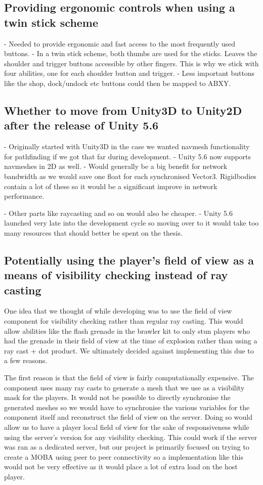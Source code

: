 \subsection{Providing ergonomic controls when using a twin stick scheme}
    - Needed to provide ergonomic and fast access to the most frequently used buttons. 
    - In a twin stick scheme, both thumbs are used for the sticks. Leaves the shoulder and trigger buttons accessible by other fingers. This is why we stick with four abilities, one for each shoulder button and trigger.
    - Less important buttons like the shop, dock/undock etc buttons could then be mapped to ABXY. 

\subsection{Whether to move from Unity3D to Unity2D after the release of Unity 5.6}
    - Originally started with Unity3D in the case we wanted navmesh functionality for pathfinding if we got that far during development. 
    - Unity 5.6 now supports navmeshes in 2D as well.
    - Would generally be a big benefit for network bandwidth as we would save one float for each synchronised Vector3. Rigidbodies contain a lot of these so it would be a significant improve in network performance. 
    
    - Other parts like raycasting and so on would also be cheaper. 
    - Unity 5.6 launched very late into the development cycle so moving over to it would take too many resources that should better be spent on the thesis. 

\subsection{Potentially using the player's field of view as a means of visibility checking instead of ray casting}
One idea that we thought of while developing was to use the field of view component for visibility checking rather than regular ray casting. This would allow abilities like the flash grenade in the brawler kit to only stun players who had the grenade in their field of view at the time of explosion rather than using a ray cast + dot product. We ultimately decided against implementing this due to a few reasons. 

The first reason is that the field of view is fairly computationally expensive. The component uses many ray casts to generate a mesh that we use as a visibility mask for the players. It would not be possible to directly synchronise the generated meshes so we would have to synchronise the various variables for the component itself and reconstruct the field of view on the server. Doing so would allow us to have a player local field of view for the sake of responsiveness while using the server's version for any visibility checking. This could work if the server was ran as a dedicated server, but our project is primarily focused on trying to create a MOBA using peer to peer connectivity so a implementation like this would not be very effective as it would place a lot of extra load on the host player. 

